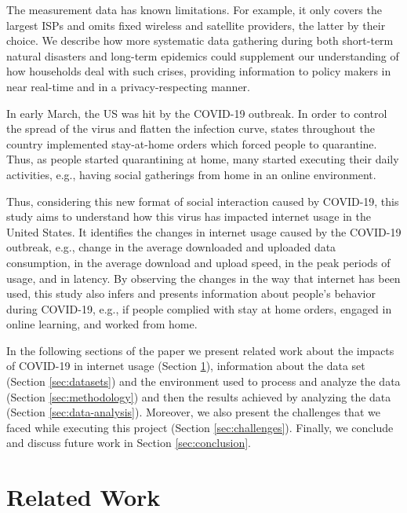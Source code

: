 \documentclass[conference,10pt]{IEEEtran}
\begin{document}
The measurement data has known limitations. For example, it only covers the largest ISPs and omits fixed wireless and satellite providers, the latter by their choice. We describe how more systematic data gathering during both short-term natural disasters and long-term epidemics could supplement our understanding of how households deal with such crises, providing information to policy makers in near real-time and in a privacy-respecting manner.


In early March, the US was hit by the COVID-19 outbreak. In order to control the spread of the virus and flatten the infection curve, states throughout the country implemented stay-at-home orders which forced people to quarantine. Thus, as people started quarantining at home, many started executing their daily activities, e.g., having social gatherings from home in an online environment.

Thus, considering this new format of social interaction caused by COVID-19, this study aims to understand how this virus has impacted internet usage in the United States. It identifies the changes in internet usage caused by the COVID-19 outbreak, e.g., change in the average downloaded and uploaded data consumption, in the average download and upload speed, in the peak periods of usage, and in latency. By observing the changes in the way that internet has been used, this study also infers and presents information about people's behavior during COVID-19, e.g., if people complied with stay at home orders, engaged in online learning, and worked from home.

In the following sections of the paper we present related work about the impacts of COVID-19 in internet usage (Section \ref{sec:related-work}), information about the data set (Section \ref{sec:datasets}) and the environment used to process and analyze the data (Section \ref{sec:methodology}) and then the results achieved by analyzing the data (Section \ref{sec:data-analysis}). Moreover, we also present the challenges that we faced while executing this project (Section \ref{sec:challenges}). Finally, we conclude and discuss future work in Section \ref{sec:conclusion}.

\section{Related Work}
\label{sec:related-work}
\end{document}
